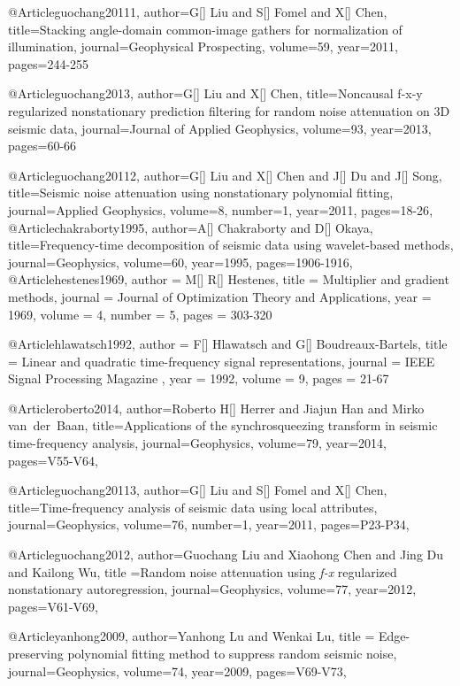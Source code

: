 @Article{guochang20111,
author={G[] Liu and S[] Fomel and X[] Chen},
title={Stacking angle-domain common-image gathers for normalization of illumination},
journal={Geophysical Prospecting},
volume=59,
year=2011,
pages={244-255}
}

@Article{guochang2013,
author={G[] Liu and X[] Chen},
title={Noncausal f-x-y regularized nonstationary prediction filtering for random noise attenuation on 3{D} seismic data},
journal={Journal of Applied Geophysics},
volume=93,
year=2013,
pages={60-66}
}


@Article{guochang20112,
author={G[] Liu and X[] Chen and J[] Du and J[] Song},
title={Seismic noise attenuation using nonstationary polynomial fitting},
journal={Applied Geophysics},
volume=8,
number=1,
year=2011,
pages={18-26},
}
@Article{chakraborty1995,
author={A[] Chakraborty and D[] Okaya},
title={Frequency-time decomposition of
seismic data using wavelet-based methods},
journal={Geophysics},
volume=60,
year=1995,
pages={1906-1916},
}
@Article{hestenes1969,
  author = 	 {M[] R[] Hestenes},
  title = 	 {Multiplier and gradient methods},
  journal = 	 {Journal of Optimization Theory and Applications},
  year = 	 1969,
  volume = 	 4,
  number = 5,
  pages = 	 {303-320}
}

@Article{hlawatsch1992,
  author = 	 {F[] Hlawatsch and G[] Boudreaux-Bartels},
  title = 	 { Linear and quadratic time-frequency signal representations},
  journal = 	 { IEEE Signal Processing Magazine },
  year = 	 1992,
  volume = 	 9,
  pages = 	 {21-67}
}

@Article{roberto2014,
author={Roberto H[] Herrer and Jiajun Han and Mirko van~der~Baan},
title={Applications of the synchrosqueezing transform
in seismic time-frequency analysis},
journal={Geophysics},
volume=79,
year=2014,
pages={V55-V64},
}




@Article{guochang20113,
author={G[] Liu and S[] Fomel and X[] Chen},
title={Time-frequency analysis of seismic data using local attributes},
journal={Geophysics},
volume=76,
number=1,
year=2011,
pages={P23-P34},
}



@Article{guochang2012,
  author={Guochang Liu and Xiaohong Chen and Jing Du and Kailong Wu},
  title ={Random noise attenuation using \emph{f-x} regularized nonstationary autoregression},
  journal={Geophysics},
  volume=77,
  year=2012,
  pages={V61-V69},
}

@Article{yanhong2009,
  author={Yanhong Lu and Wenkai Lu},
  title ={ Edge-preserving polynomial fitting method to suppress random seismic noise},
  journal={Geophysics},
  volume=74,
  year=2009,
  pages={V69-V73},
}

